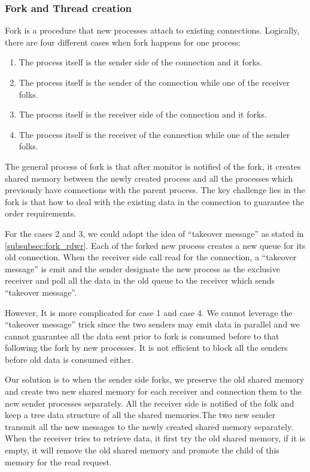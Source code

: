 \subsubsection{Fork and Thread creation}
Fork is a procedure that new processes attach to existing connections. Logically, there are four different cases when fork happens for one process:
\begin{enumerate}
	\item The process itself is the sender side of the connection and it forks.
	\item The process itself is the sender of the connection while one of the receiver folks.
	\item The process itself is the receiver side of the connection and it forks.
	\item The process itself is the receiver of the connection while one of the sender folks.
\end{enumerate}

The general process of fork is that after monitor is notified of the fork, it creates shared memory between the newly created process and all the processes which previously have connections with the parent process. The key challenge lies in the fork is that how to deal with the existing data in the connection to guarantee the order requirements.

For the cases 2 and 3, we could adopt the idea of ``takeover message'' as stated in \ref{subsubsec:fork_rdwr}. Each of the forked new process creates a new queue for its old connection. When the receiver side call read for the connection, a ``takeover message'' is emit and the sender designate the new process as the exclusive receiver and poll all the data in the old queue to the receiver which sends ``takeover message''.

However, It is more complicated for case 1 and case 4. We cannot leverage the ``takeover message'' trick since the two senders may emit data in parallel and we cannot guarantee all the data sent prior to fork is consumed before to that following the fork by new processes. It is not efficient to block all the senders before old data is consumed either.

Our solution is to when the sender side forks, we preserve the old shared memory and create two new shared memory for each receiver and connection them to the new sender processes separately. All the receiver side is notified of the folk and keep a tree data structure of all the shared memories.The two new sender transmit all the new messages to the newly created shared memory separately. When the receiver tries to retrieve data, it first try the old shared memory, if it is empty, it will remove the old shared memory and promote the child of this memory for the read request. 

